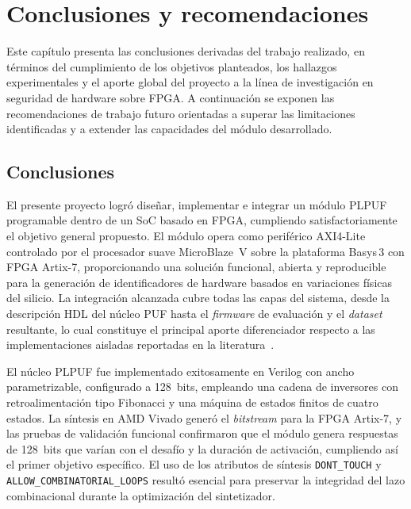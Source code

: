 
\chapter{Conclusiones y recomendaciones}
\label{ch:conclusiones}

Este capítulo presenta las conclusiones derivadas del trabajo realizado, en
términos del cumplimiento de los objetivos planteados, los hallazgos
experimentales y el aporte global del proyecto a la línea de investigación
en seguridad de hardware sobre FPGA. A continuación se exponen las
recomendaciones de trabajo futuro orientadas a superar las limitaciones
identificadas y a extender las capacidades del módulo desarrollado.

\section{Conclusiones}

El presente proyecto logró diseñar, implementar e integrar un módulo PLPUF
programable dentro de un SoC basado en FPGA, cumpliendo satisfactoriamente
el objetivo general propuesto. El módulo opera como periférico AXI4-Lite
controlado por el procesador suave MicroBlaze~V sobre la plataforma Basys\,3
con FPGA Artix-7, proporcionando una solución funcional, abierta y
reproducible para la generación de identificadores de hardware basados en
variaciones físicas del silicio. La integración alcanzada cubre todas las
capas del sistema, desde la descripción HDL del núcleo PUF hasta el
\textit{firmware} de evaluación y el \textit{dataset} resultante, lo cual
constituye el principal aporte diferenciador respecto a las
implementaciones aisladas reportadas en la
literatura~\cite{lata_2023_fpgapuf, anandakumar_2021_fpgapufs}.

El núcleo PLPUF fue implementado exitosamente en Verilog con ancho
parametrizable, configurado a 128~bits, empleando una cadena de inversores con
retroalimentación tipo Fibonacci y una máquina de estados finitos de cuatro
estados. La síntesis en AMD Vivado generó el \textit{bitstream} para la FPGA
Artix-7, y las pruebas de validación funcional confirmaron que el módulo
genera respuestas de 128~bits que varían con el desafío y la duración de
activación, cumpliendo así el primer objetivo específico. El uso de los
atributos de síntesis \texttt{DONT\_TOUCH} y
\texttt{ALLOW\_COMBINATORIAL\_LOOPS} resultó esencial para preservar la
integridad del lazo combinacional durante la optimización del sintetizador.

